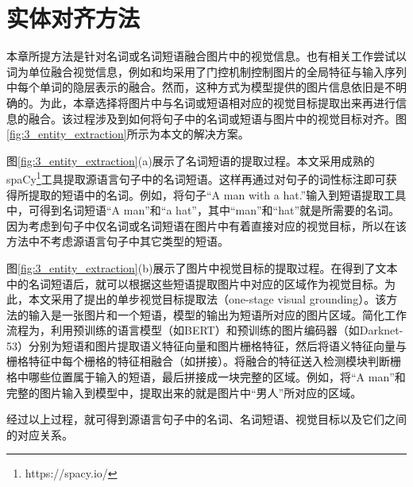 \section{实体对齐方法}
\label{sec:3_entity_extraction}
本章所提方法是针对名词或名词短语融合图片中的视觉信息。也有相关工作尝试以词为单位融合视觉信息，例如和均采用了门控机制控制图片的全局特征与输入序列中每个单词的隐层表示的融合。然而，这种方式为模型提供的图片信息依旧是不明确的。为此，本章选择将图片中与名词或短语相对应的视觉目标提取出来再进行信息的融合。该过程涉及到如何将句子中的名词或短语与图片中的视觉目标对齐。图\ref{fig:3_entity_extraction}所示为本文的解决方案。


图\ref{fig:3_entity_extraction}(a)展示了名词短语的提取过程。本文采用成熟的spaCy\footnote{https://spacy.io/}工具提取源语言句子中的名词短语。这样再通过对句子的词性标注即可获得所提取的短语中的名词。例如，将句子“A man with a hat.”输入到短语提取工具中，可得到名词短语“A man”和“a hat”，其中“man”和“hat”就是所需要的名词。因为考虑到句子中仅名词或名词短语在图片中有着直接对应的视觉目标，所以在该方法中不考虑源语言句子中其它类型的短语。

图\ref{fig:3_entity_extraction}(b)展示了图片中视觉目标的提取过程。在得到了文本中的名词短语后，就可以根据这些短语提取图片中对应的区域作为视觉目标。为此，本文采用了提出的单步视觉目标提取法（one-stage visual grounding）。该方法的输入是一张图片和一个短语，模型的输出为短语所对应的图片区域。简化工作流程为，利用预训练的语言模型（如BERT）和预训练的图片编码器（如Darknet-53）分别为短语和图片提取语义特征向量和图片栅格特征，然后将语义特征向量与栅格特征中每个栅格的特征相融合（如拼接）。将融合的特征送入检测模块判断栅格中哪些位置属于输入的短语，最后拼接成一块完整的区域。例如，将“A man”和完整的图片输入到模型中，提取出来的就是图片中“男人”所对应的区域。

经过以上过程，就可得到源语言句子中的名词、名词短语、视觉目标以及它们之间的对应关系。
